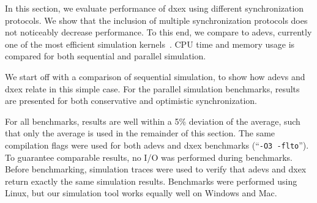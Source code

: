In this section, we evaluate performance of dxex using different synchronization protocols.
We show that the inclusion of multiple synchronization protocols does not noticeably decrease performance.
To this end, we compare to adevs, currently one of the most efficient simulation kernels~\cite{DEVSSurvey}.
CPU time and memory usage is compared for both sequential and parallel simulation.

We start off with a comparison of sequential simulation, to show how adevs and dxex relate in this simple case.
For the parallel simulation benchmarks, results are presented for both conservative and optimistic synchronization.

For all benchmarks, results are well within a 5\% deviation of the average, such that only the average is used in the remainder of this section.
The same compilation flags were used for both adevs and dxex benchmarks (``\texttt{-O3 -flto}'').
To guarantee comparable results, no I/O was performed during benchmarks.
Before benchmarking, simulation traces were used to verify that adevs and dxex return exactly the same simulation results.
Benchmarks were performed using Linux, but our simulation tool works equally well on Windows and Mac.

